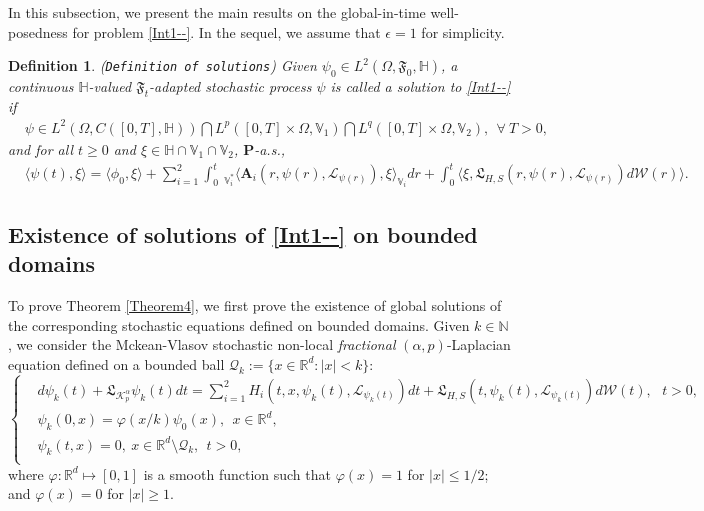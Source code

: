 \documentclass[11pt]{article}
\renewcommand{\leq}{\leqslant}
\renewcommand{\geq}{\geqslant}  %
\newtheorem{definition}[theorem]{Definition}
\numberwithin{equation}{section}
\begin{document}
In this subsection, we present the main results on the global-in-time well-posedness for problem \eqref{Int1--}. In the sequel, we assume that $\epsilon =1$ for   simplicity.

\begin{definition}\label{Defsolutionsolution}
(\texttt{Definition of solutions}) Given
$\psi_0\in L^2(\Omega,\mathfrak{F}_0, \mathbb{H})$, a continuous $\mathbb{H}$-valued
$\mathfrak{F}_t$-adapted stochastic process $\psi$
is called a solution to \eqref{Int1--}
if
\begin{align}&\label{Defsolution0}\psi
 \in L^2(\Omega, C([0,T],\mathbb{H} ))\bigcap L^p([0,T]\times\Omega, \mathbb{V}_1)\bigcap L^q([0,T]\times\Omega, \mathbb{V}_2  ),\ \ \forall\ T>0,
\end{align}
and for all $t\geq0$ and $\xi\in\mathbb{H}\cap\mathbb{V}_1
\cap\mathbb{V}_2$, $\mathbf{P}$-a.s.,
\begin{align}\label{Defsolution1}
&\langle \psi(t) ,\xi\rangle=\langle \phi_0 ,\xi\rangle+\sum_{i=1}^2
 \int_{0}^t\ _{\mathbb{V}_i^*}\big\langle \mathbf{A}_i(r,\psi(r),\mathcal{L}_{
\psi(r)}),
\xi\big  \rangle_{\mathbb{V}_i}        dr
 +\int_{0}^t
 \big\langle \xi, \mathfrak{L}_{H,S}(r,\psi(r),\mathcal{L}_{
\psi(r)})d\mathcal{W}(r) \big\rangle.
\end{align}
\end{definition}

\subsection{Existence of solutions of \eqref{Int1--} on bounded domains}
To prove Theorem \ref{Theorem4}, we first prove the existence of global solutions of the corresponding stochastic equations defined on bounded domains.
Given $k\in\mathbb{N}$,
we consider the Mckean-Vlasov
stochastic non-local \emph{fractional} $(\alpha,p)$-Laplacian equation
 defined on a bounded ball   $\mathcal{Q}_{k}:=\{x\in\mathbb{R}^d: |x|< k\}$:
\begin{equation}\label{Int1aae}
\left\{
  \begin{aligned}
  &d \psi_k(t) + \mathfrak{L}_{\mathcal{K}_{p}^\alpha} \psi_k(t) dt
=\sum_{i=1}^2H_i(t,x,\psi_k(t),\mathcal{L}_{
\psi_k(t)})dt
+ \mathfrak{L}_{H,S}(t,\psi_k(t),
\mathcal{L}_{
\psi_k(t)})d\mathcal{W}(t), \ \ \ t>0, \\
  &\psi_k(0,x)=\varphi(x/k)\psi_0(x),\ \ x\in\mathbb{R}^d,
  \\
  &\psi_k(t,x)=0,\ x\in\mathbb{R}^d\setminus\mathcal{Q}_{k},\ \ t>0,
  \\
  \end{aligned}
\right.
\end{equation}
where
$\varphi:\mathbb{R}^d\mapsto[0,1]$ is a smooth function such that
$\varphi(x)=1$ for $|x|\leq1/2$; and
$\varphi(x)=0$ for $|x|\geq1$.
\end{document}
